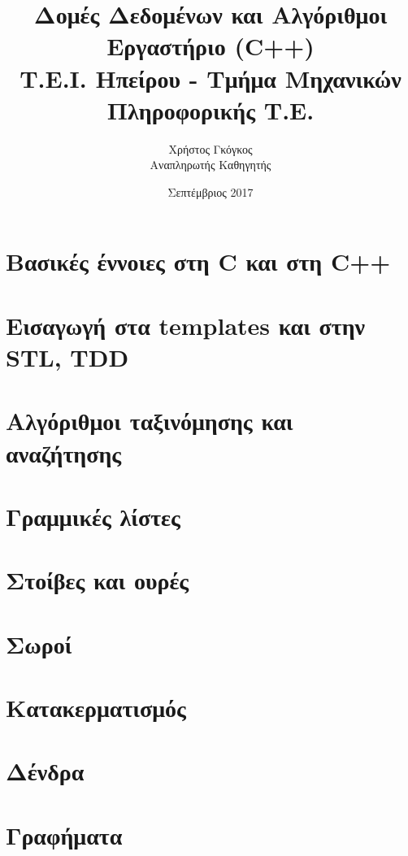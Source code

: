 \documentclass[11pt,a4paper]{book}
\title{Δομές Δεδομένων και Αλγόριθμοι \\ Εργαστήριο (C++)\\ Τ.Ε.Ι. Ηπείρου - Τμήμα Μηχανικών Πληροφορικής Τ.Ε.}
\author{Χρήστος Γκόγκος  \\ Αναπληρωτής Καθηγητής }
\date{Σεπτέμβριος 2017}
\begin{document}
\frontmatter
\maketitle
\tableofcontents
\mainmatter

\chapter{Βασικές έννοιες στη C και στη C++}


\chapter{Εισαγωγή στα templates και στην STL, TDD}


\chapter{Αλγόριθμοι ταξινόμησης και αναζήτησης}


\chapter{Γραμμικές λίστες}


\chapter{Στοίβες και ουρές}


\chapter{Σωροί}


\chapter{Κατακερματισμός}

\chapter{Δένδρα}

\chapter{Γραφήματα}

\begin{versionhistory}
\end{versionhistory}
\end{document}
